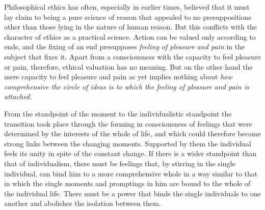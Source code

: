 \documentclass[12pt,a4paper,openany]{book}
\newcommand{\opage}[1]{\marginnote{\footnotesize\textit{[#1]}}}
\begin{document}
Philosophical ethics has often, especially in earlier times, believed that it must lay claim to being
a pure science of reason that appealed to no presuppositions other than those lying in the nature of
human reason. But this conflicts
\opage{36}with the character of ethics as a practical science. Action can be valued only according to ends,
and the fixing of an end presupposes \textit{feeling of pleasure and pain} in the subject that fixes
it. Apart from a consciousness with the capacity to feel pleasure or pain, therefore, ethical
valuation has no meaning. But on the other hand the mere capacity to feel pleasure and pain as yet
implies nothing about \textit{how comprehensive the circle of ideas is to which the feeling of
pleasure and pain is attached.}

From the standpoint of the moment to the individualistic standpoint the transition took place
through the forming in consciousness of feelings that were determined by the interests of the whole
of life, and which could therefore become strong links between the changing moments. Supported by
them the individual feels its unity in spite of the constant change. If there is a wider standpoint
than that of individualism, there must be feelings that, by stirring in the single individual, can
bind him to a more comprehensive whole in a way similar to that in which the single moments and
promptings in him are bound to the whole of the individual life. There must be a power that binds
the single individuals to one another and abolishes the isolation between them.
\end{document}
